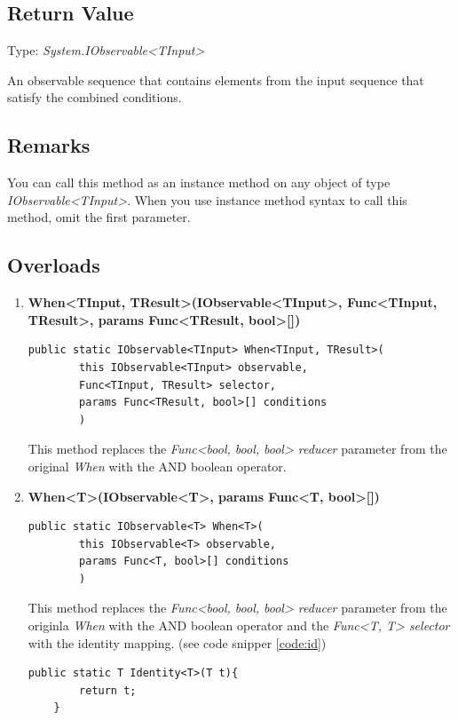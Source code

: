 \documentclass[12pt,a4paper,twoside]{report}
\begin{document}
\subsection{Return Value}
Type: \textit{System.IObservable<TInput>}

An observable sequence that contains elements from the input sequence that satisfy the combined conditions.

\subsection{Remarks}
You can call this method as an instance method on any object of type \textit{IObservable<TInput>}. When you use 
instance method syntax to call this method, omit the first parameter.

\subsection{Overloads}

\begin{enumerate}
    \item \textbf{When<TInput, TResult>(IObservable<TInput>, Func<TInput, TResult>, params Func<TResult, bool>[])} \\
\begin{lstlisting}[caption=Declaration]
    public static IObservable<TInput> When<TInput, TResult>(
        this IObservable<TInput> observable,
        Func<TInput, TResult> selector,
        params Func<TResult, bool>[] conditions
        )
\end{lstlisting}
        This method replaces the \textit{Func<bool, bool, bool> reducer} parameter from the original \textit{When} with the AND boolean operator.
    
    \item \textbf{When<T>(IObservable<T>, params Func<T, bool>[])} \\
\begin{lstlisting}[caption=Declaration]
    public static IObservable<T> When<T>(
        this IObservable<T> observable,
        params Func<T, bool>[] conditions
        )
\end{lstlisting}
        This method replaces the \textit{Func<bool, bool, bool> reducer} parameter from the originla \textit{When} with the AND boolean operator and the \textit{Func<T, T> selector} with the identity mapping. (see code snipper \ref{code:id})
        \\
\begin{lstlisting}[caption=Identity mapping, label=code:id]
    public static T Identity<T>(T t){
        return t;
    }
\end{lstlisting}
\end{enumerate}
\end{document}
